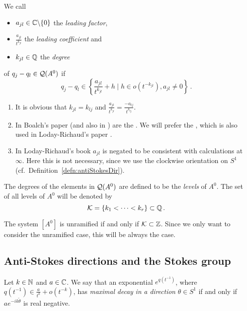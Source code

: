 \begin{defn}\label{defn:determiningPolysOfEndA}
  We call
  \begin{itemize}
    \item $a_{jl}\in\mathbb{C}\backslash\{0\}$ the \emph{leading factor},
    \item $\frac{a_{jl}}{t^{k_{jl}}}$ the \emph{leading
      coefficient} and
    \item $k_{jl}\in\mathbb{Q}$ the \emph{degree}
  \end{itemize}
  of $q_j-q_l\in\mathcal{Q}(A^0)$ if
  \[
    q_j-q_l\in\left\{\frac{a_{jl}}{t^{k_{jl}}}+h \mid h \in o(t^{-k_{jl}}),
      a_{jl}\neq0
    \right\}\,.
  \]
  \begin{s-rem}
    \begin{enumerate}
      \item It is obvious that $k_{jl}=k_{lj}$ and
        $\frac{a_{jl}}{t^{k_{jl}}}=\frac{-a_{lj}}{t^{k_{lj}}}$.
      \item In Boalch's paper \cite{boalch} (and also in \cite{thboalch}) are
        the .
        We will prefer the , which is also used in
        Loday-Richaud's paper \cite{Loday1994}.
      \item In Loday-Richaud's book \cite[Def.4.3.6]{Loday2014} $a_{jl}$ is
        negated to be consistent with calculations at $\infty$.
        Here this is not necessary, since we use the clockwise orientation on
        $S^1$ (cf.\ Definition~\ref{defn:antiStokesDir}).
    \end{enumerate}
  \end{s-rem}
  The degrees of the elements in $\mathcal{Q}(A^0)$ are defined to be  the
  \emph{levels} of $A^0$.
  The set of all levels of $A^0$ will be denoted by
  \[
    \mathcal{K}=\{k_1<\dots<k_r\} \subset \mathbb{Q} \,.
  \]
  \begin{s-rem}
    The system $[A^0]$ is unramified if and only if $\mathcal{K}\subset\mathbb{Z}$.
    Since we only want to consider the unramified case, this will be always the
    case.
  \end{s-rem}
\end{defn}

\subsection{Anti-Stokes directions and the Stokes group}
\begin{defn}
  Let $k\in\mathbb{N}$ and $a\in\mathbb{C}$.
  We say that an exponential $e^{q(t^{-1})}$, where
  $q(t^{-1})\in\frac{a}{t^{k}}+o(t^{-k})$, has \emph{maximal decay in a
  direction $\theta\in S^1$} if and only if $ae^{-ik\tilde\theta}$ is real
  negative. 
  \begin{comment}
    $be^0\in\C$ corresponding to has maximal decay if and only if \PROBLEM[$1$
    has maximal decay?]
  \end{comment}
\end{defn}

